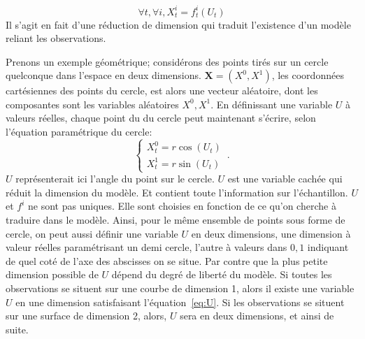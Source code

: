 \begin{equation}
\forall t, \forall i, X^i_t = f^i_t(U_t)
\label{eq:U}
\end{equation}
Il s'agit en fait d'une réduction de dimension qui traduit l'existence d'un modèle reliant les observations.

Prenons un exemple géométrique; considérons des points tirés sur un cercle quelconque dans l'espace en deux dimensions. $\mathbf{X} = (X^0,X^1)$, les coordonnées cartésiennes des points du cercle, est alors une vecteur aléatoire, dont les composantes sont les variables aléatoires $X^0,X^1$. En définissant une variable $U$ à valeurs réelles, chaque point du du cercle peut maintenant s'écrire, selon l'équation paramétrique du cercle: 
$$
 \begin{cases}
     X^0_t = r  \cos(U_t)\\
     X^1_t = r \sin(U_t)
    \end{cases}\,.
$$
$U$ représenterait ici l'angle du point sur le cercle. $U$ est une variable cachée qui réduit la dimension du modèle. Et contient toute l'information sur l'échantillon. 
$U$ et ${f^i}$ ne sont pas uniques. Elle sont choisies en fonction de ce qu'on cherche à traduire dans le modèle. Ainsi, pour le même ensemble de points sous forme de cercle, on peut aussi définir une variable $U$ en deux dimensions, une dimension à valeur réelles paramétrisant un demi cercle, l'autre à valeurs dans ${0,1}$ indiquant de quel coté de l'axe des abscisses on se situe.
Par contre que la plus petite dimension possible de $U$ dépend du degré de liberté du modèle. Si toutes les observations se situent sur une courbe de dimension 1, alors il existe une variable $U$ en une dimension satisfaisant l'équation~\ref{eq:U}. Si les observations se situent sur une surface de dimension 2, alors, $U$ sera en deux dimensions, et ainsi de suite.

